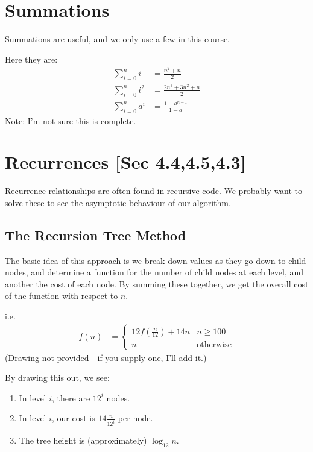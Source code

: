     \section{Summations}
        Summations are useful, and we only use a few in this course.

        Here they are:
        \begin{align*}
            \sum_{i=0}^n i &= \frac{n^2 + n}{2} \\
            \sum_{i=0}^n i^2 &= \frac{2n^3 + 3n^2 + n}{2} \\
            \sum_{i=0}^n a^i &= \frac{1 - a^{n-1}}{1-a}
        \end{align*}
        Note: I'm not sure this is complete.

    \section{Recurrences [Sec 4.4,4.5,4.3]}
        Recurrence relationships are often found in recursive code. We probably
        want to solve these to see the asymptotic behaviour of our algorithm.

        \subsection{The Recursion Tree Method}
            The basic idea of this approach is we break down values as they go
            down to child nodes, and determine a function for the number of
            child nodes at each level, and another the cost of each node. By
            summing these together, we get the overall cost of the function with
            respect to $n$.

            i.e.
            \begin{align*}
                f(n) &= \left\{
                    \begin{array}{lr}
                        12 f\left(\frac{n}{12}\right) + 14n & n \ge 100 \\
                        n & \text{otherwise}
                    \end{array}
                \right.
            \end{align*}
            (Drawing not provided - if you supply one, I'll add it.)

            By drawing this out, we see:
            \begin{enumerate}
                \item In level $i$, there are $12^i$ nodes.
                \item In level $i$, our cost is $14 \frac{n}{12^i}$ per node.
                \item The tree height is (approximately) $\log_{12}n$.
            \end{enumerate}

